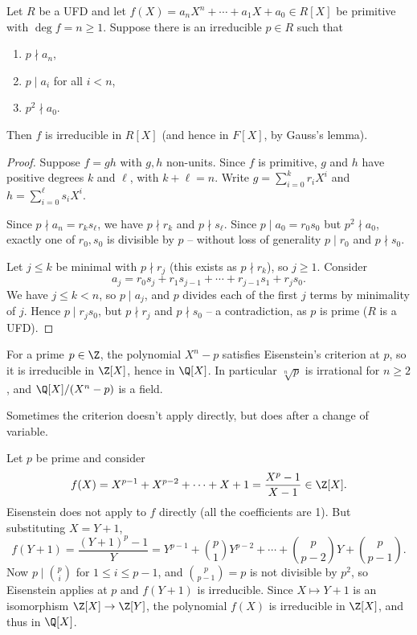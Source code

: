 \begin{theorem}
	Let $R$ be a UFD and let $f(X) = a_n X^n + \cdots + a_1 X + a_0 \in R[X]$ be primitive with $\deg f = n \geq 1$. Suppose there is an irreducible $p \in R$ such that
	\begin{enumerate}[label=(\roman*)]
		\item $p \nmid a_n$,
		\item $p \mid a_i$ for all $i < n$,
		\item $p^2 \nmid a_0$.
	\end{enumerate}
	Then $f$ is irreducible in $R[X]$ (and hence in $F[X]$, by Gauss's lemma).
\end{theorem}
\begin{proof}
	Suppose $f = gh$ with $g, h$ non-units. Since $f$ is primitive, $g$ and $h$ have positive degrees $k$ and $\ell$, with $k + \ell = n$. Write $g = \sum_{i=0}^{k} r_i X^i$ and $h = \sum_{i = 0}^{\ell} s_i X^i$.

	Since $p \nmid a_n = r_k s_\ell$, we have $p \nmid r_k$ and $p \nmid s_\ell$. Since $p \mid a_0 = r_0 s_0$ but $p^2 \nmid a_0$, exactly one of $r_0, s_0$ is divisible by $p$ -- without loss of generality $p \mid r_0$ and $p \nmid s_0$.

	Let $j \leq k$ be minimal with $p \nmid r_j$ (this exists as $p \nmid r_k$), so $j \geq 1$. Consider
	$$
	a_j = r_0 s_j + r_1 s_{j - 1} + \cdots + r_{j-1}s_1 + r_j s_0.
	$$
	We have $j \leq k < n$, so $p \mid a_j$, and $p$ divides each of the first $j$ terms by minimality of $j$. Hence $p \mid r_j s_0$, but $p \nmid r_j$ and $p \nmid s_0$ -- a contradiction, as $p$ is prime ($R$ is a UFD).
\end{proof}

\begin{example}
	For a prime $p \in \Z$, the polynomial $X^n - p$ satisfies Eisenstein's criterion at $p$, so it is irreducible in $\Z[X]$, hence in $\Q[X]$. In particular $\sqrt[n]{p}$ is irrational for $n \geq 2$, and $\Q[X]/(X^n - p)$ is a field.
\end{example}

Sometimes the criterion doesn't apply directly, but does after a change of variable.

\begin{example}
	Let $p$ be prime and consider
	$$
	f(X) = X^{p - 1} + X^{p - 2} + \cdots + X + 1 = \frac{X^p - 1}{X - 1} \in \Z[X].
	$$
	Eisenstein does not apply to $f$ directly (all the coefficients are 1). But substituting $X = Y + 1$,
	$$
	f(Y + 1) = \frac{(Y + 1)^p - 1}{Y} = Y^{p -1} + \binom{p}{1}Y^{p - 2} + \cdots + \binom{p}{p - 2}Y + \binom{p}{p - 1}.
	$$
	Now $p \mid \binom{p}{i}$ for $1 \leq i \leq p - 1$, and $\binom{p}{p-1} = p$ is not divisible by $p^2$, so Eisenstein applies at $p$ and $f(Y + 1)$ is irreducible. Since $X \mapsto Y + 1$ is an isomorphism $\Z[X] \rightarrow \Z[Y]$, the polynomial $f(X)$ is irreducible in $\Z[X]$, and thus in $\Q[X]$.
\end{example}


